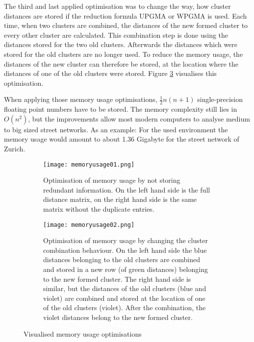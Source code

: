 The third and last applied optimisation was to change the way, how cluster distances are stored if the reduction formula \acrshort{UPGMA} or \acrshort{WPGMA} is used. Each time, when two clusters are combined, the distances of the new formed cluster to every other cluster are calculated. This combination step is done using the distances stored for the two old clusters. Afterwards the distances which were stored for the old clusters are no longer used. To reduce the memory usage, the distances of the new cluster can therefore be stored, at the location where the distances of one of the old clusters were stored. Figure \ref{fig:memory_usage_02} visualises this optimisation.

When applying those memory usage optimisations, $\frac{1}{2}n(n+1)$ single-precision floating point numbers have to be stored. The memory complexity still lies in $O(n^2)$, but the improvements allow most modern computers to analyse medium to big sized street networks. As an example: For the used environment the memory usage would amount to about 1.36 Gigabyte for the street network of Zurich.

\begin{figure}
    \centering
    \begin{subfigure}[b]{\textwidth}
        \texttt{[image: memoryusage01.png]}
        \caption{Optimisation of memory usage by not storing redundant information. On the left hand side is the full distance matrix, on the right hand side is the same matrix without the duplicate entries.}
        \label{fig:memory_usage_01}
    \end{subfigure}
    \par\medskip
    \begin{subfigure}[b]{\textwidth}
        \texttt{[image: memoryusage02.png]}
        \caption{Optimisation of memory usage by changing the cluster combination behaviour. On the left hand side the blue distances belonging to the old clusters are combined and stored in a new row (of green distances) belonging to the new formed cluster. The right hand side is similar, but the distances of the old clusters (blue and violet) are combined and stored at the location of one of the old clusters (violet). After the combination, the violet distances belong to the new formed cluster.}
        \label{fig:memory_usage_02}
    \end{subfigure}
    \caption{Visualised memory usage optimisations}
\end{figure}

